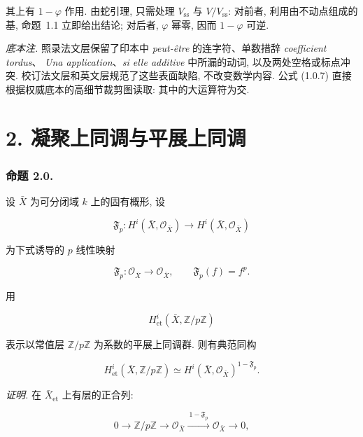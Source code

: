 其上有 $1-\varphi$ 作用. 由蛇引理, 只需处理 $V_{\mathrm{ss}}$
与 $V/V_{\mathrm{ss}}$: 对前者, 利用由不动点组成的基, 命题~1.1 立即给出结论;
对后者, $\varphi$ 幂零, 因而 $1-\varphi$ 可逆.

\medskip
\noindent\emph{底本注.}
照录法文层保留了印本中 \emph{peut-être} 的连字符、单数措辞 \emph{coefficient tordus}、
\emph{Una application}、\emph{si elle additive} 中所漏的动词,
以及两处空格或标点冲突. 校订法文层和英文层规范了这些表面缺陷, 不改变数学内容.
公式 (1.0.7) 直接根据权威底本的高细节裁剪图读取: 其中的大运算符为交.

\section*{2. 凝聚上同调与平展上同调}

\subsubsection*{命题 2.0.}
设 $\bar X$ 为可分闭域 $k$ 上的固有概形, 设

\begin{equation}\tag{2.0.1}
\mathfrak F_p:H^i(\bar X,\mathcal O_{\bar X})
\longrightarrow H^i(\bar X,\mathcal O_{\bar X})
\end{equation}

为下式诱导的 $p$ 线性映射

\begin{equation}\tag{2.0.2}
\mathfrak F_p:\mathcal O_{\bar X}\longrightarrow\mathcal O_{\bar X},
\qquad \mathfrak F_p(f)=f^p.
\end{equation}

用

\[
H^i_{\mathrm{et}}(\bar X,\mathbb Z/p\mathbb Z)
\]

表示以常值层 $\mathbb Z/p\mathbb Z$ 为系数的平展上同调群. 则有典范同构

\begin{equation}\tag{2.0.3}
H^i_{\mathrm{et}}(\bar X,\mathbb Z/p\mathbb Z)
\simeq
H^i(\bar X,\mathcal O_{\bar X})^{1-\mathfrak F_p}.
\end{equation}

\medskip
\noindent\emph{证明.}
在 $\bar X_{\mathrm{et}}$ 上有层的正合列:

\begin{equation}\tag{2.0.4}
0\longrightarrow\mathbb Z/p\mathbb Z\longrightarrow\mathcal O_{\bar X}
\xrightarrow{\ 1-\mathfrak F_p\ }\mathcal O_{\bar X}\longrightarrow0,
\end{equation}

